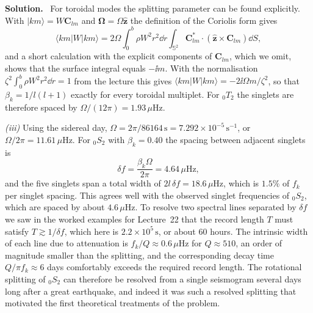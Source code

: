 \documentclass[a4paper,12pt]{paper}
\newcounter{example}
\newenvironment{solution}{\par\noindent\textbf{Solution.}\ }{\par\medskip}
\begin{document}
\begin{solution}
For toroidal modes the splitting parameter can be found explicitly. With
$|km\rangle=W\mathbf{C}_{lm}$ and $\bm{\Omega}=\Omega\hat{\mathbf{z}}$ the definition of the
Coriolis form gives
\begin{equation}
\langle km|W|km\rangle=2\Omega\int_{0}^{b}\rho W^{2}r^{2}\dd r
\int_{\mathbb{S}^{2}}\mathbf{C}_{lm}^{*}\cdot\left(\hat{\mathbf{z}}\times\mathbf{C}_{lm}\right)\dd S,
\label{eq:25}
\end{equation}
and a short calculation with the explicit components of $\mathbf{C}_{lm}$, which we omit,
shows that the surface integral equals $-\ii m$. With the normalisation
$\zeta^{2}\int_{0}^{b}\rho W^{2}r^{2}\dd r=1$ from the lecture this gives
$\langle km|W|km\rangle=-2\ii\Omega m/\zeta^{2}$, so that $\beta_{k}=1/l(l+1)$ exactly for every
toroidal multiplet. For ${}_{0}T_{2}$ the singlets are therefore spaced by
$\Omega/(12\pi)=1.93\,\mu\mathrm{Hz}$.

\medskip
\noindent\textit{(iii)} Using the sidereal day, $\Omega=2\pi/86164\,\mathrm{s}=7.292\times10^{-5}\,\mathrm{s^{-1}}$,
or $\Omega/2\pi=11.61\,\mu\mathrm{Hz}$. For ${}_{0}S_{2}$ with $\beta_{k}=0.40$ the spacing
between adjacent singlets is
\begin{equation}
\delta f=\frac{\beta_{k}\Omega}{2\pi}=4.64\,\mu\mathrm{Hz},
\label{eq:26}
\end{equation}
and the five singlets span a total width of $2l\,\delta f=18.6\,\mu\mathrm{Hz}$, which is
$1.5\%$ of $f_{k}$ per singlet spacing. This agrees well with the observed singlet frequencies
of ${}_{0}S_{2}$, which are spaced by about $4.6\,\mu\mathrm{Hz}$. To resolve two spectral
lines separated by $\delta f$ we saw in the worked examples for Lecture~22 that the record
length $T$ must satisfy $T\gtrsim1/\delta f$, which here is $2.2\times10^{5}\,\mathrm{s}$, or
about $60$ hours. The intrinsic width of each line due to attenuation is
$f_{k}/Q\approx0.6\,\mu\mathrm{Hz}$ for $Q\approx510$, an order of magnitude smaller than the
splitting, and the corresponding decay time $Q/\pi f_{k}\approx6$ days comfortably exceeds the
required record length. The rotational splitting of ${}_{0}S_{2}$ can therefore be resolved
from a single seismogram several days long after a great earthquake, and indeed it was such a
resolved splitting that motivated the first theoretical treatments of the problem.
\end{solution}
\end{document}
